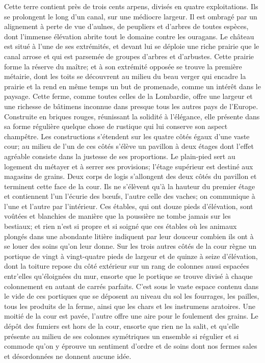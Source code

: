 Cette terre contient près de trois cents arpens, divisés en quatre exploitations. Ils se prolongent le long d'un canal, sur une médiocre largeur. Il est ombragé par un alignement à perte de vue d'aulnes, de peupliers et d'arbres de toutes espèces, dont l'immense élévation abrite tout le domaine contre les ouragans.
Le château est situé à l'une de ses extrémités, et devant lui se déploie une riche\setcounter{page}{396} prairie que le canal arrose et qui est parsemée de groupes d'arbres et d'arbustes. Cette prairie forme la réserve du maître; et à son extrémité opposée se trouve la première métairie, dont les toits se découvrent au milieu du beau verger qui encadre la prairie et la rend en même temps un but de promenade, comme un intérêt dans le paysage.
Cette ferme, comme toutes celles de la Lombardie, offre une largeur et une richesse de bâtimens inconnue dans presque tous les autres pays de l'Europe. Construite en briques rouges, réunissant la solidité à l'élégance, elle présente dans sa forme régulière quelque chose de rustique qui lui conserve son aspect champêtre.
Les constructions s'étendent sur les quatre côtés égaux d'une vaste cour; au milieu de l'un de ces côtés s'élève un pavillon à deux étages dont l'effet agréable consiste dans la justesse de ses proportions. Le plain-pied sert au logement du métayer et à serrer ses provisions; l'étage supérieur est destiné aux magasins de grains. Deux corps de logis s'allongent des deux côtés du pavillon et terminent cette face de la cour. Ils ne s'élèvent qu'à la hauteur du premier étage et contiennent l'un l'écurie des bœufs, l'autre celle des vaches; on communique à l'une et\setcounter{page}{397} l'autre par l'intérieur. Ces étables, qui ont douze pieds d'élévation, sont voûtées et blanchies de manière que la poussière ne tombe jamais sur les bestiaux; et rien n'est si propre et si soigné que ces étables où les animaux plongés dans une abondante litière indiquent par leur douceur combien ils ont à se louer des soins qu'on leur donne.
Sur les trois autres côtés de la cour règne un portique de vingt à vingt-quatre pieds de largeur et de quinze à seize d'élévation, dont la toiture repose du côté extérieur sur un rang de colonnes aussi espacées entr'elles qu'éloignées du mur, ensorte que le portique se trouve divisé à chaque colonnement en autant de carrés parfaits.
C'est sous le vaste espace contenu dans le vide de ces portiques que se déposent au niveau du sol les fourrages, les pailles, tous les produits de la ferme, ainsi que les chars et les instrumens aratoires. Une moitié de la cour est pavée, l'autre offre une aire pour le foulement des grains. Le dépôt des fumiers est hors de la cour, ensorte que rien ne la salit, et qu'elle présente au milieu de ses colonnes symétriques un ensemble si régulier et si commode qu'on y éprouve un sentiment d'ordre et de soins dont nos fermes sales et désordonnées ne donnent aucune idée.
